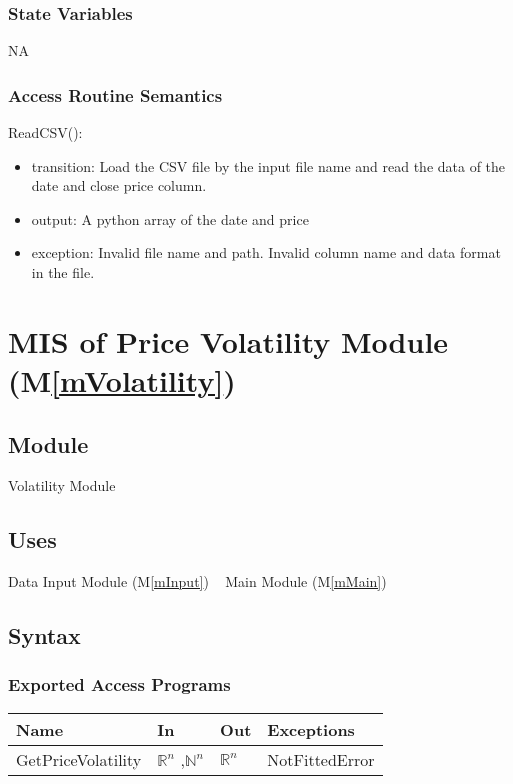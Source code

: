 \documentclass[12pt, titlepage]{article}
\newcommand{\mref}[1]{M\ref{#1}}
\begin{document}
\subsubsection{State Variables}
NA
\subsubsection{Access Routine Semantics}

\noindent ReadCSV():
\begin{itemize}
\item transition: Load the CSV file by the input file name and read the data of
  the date and close price column.  
\item output: A python array of the date and price 
\item exception: Invalid file name and path. Invalid column name and data format
  in the file.  
\end{itemize}




\section{MIS of Price Volatility Module (\mref{mVolatility}) } 

\subsection{Module}
Volatility Module
\subsection{Uses}
Data Input Module (\mref{mInput})
~\newline
Main Module (\mref{mMain})
\subsection{Syntax}

\subsubsection{Exported Access Programs}

\begin{center}
\begin{tabular}{p{4cm} p{2cm} p{2cm} p{4cm}}
\hline
\textbf{Name} & \textbf{In} & \textbf{Out} & \textbf{Exceptions} \\
\hline

GetPriceVolatility & $\mathbb{R}^n$ ,$\mathbb{N}^n$ & $\mathbb{R}^n$ & NotFittedError \\
\hline
\end{tabular}
\end{center}
\end{document}
